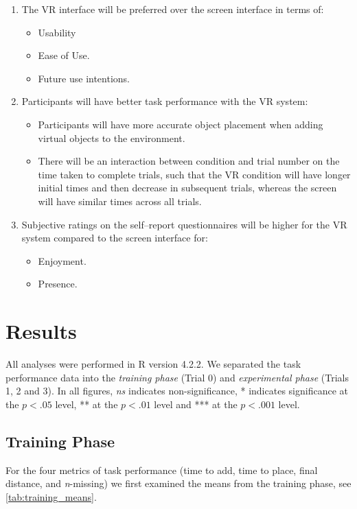 \documentclass[letterpaper, 10 pt, conference]{ieeeconf}  %
\begin{document}
\begin{enumerate}
    \item The VR interface will be preferred over the screen interface in terms of: 
    \begin{itemize}
        \item[a.] Usability
        \item[b.] Ease of Use.
        \item[c.] Future use intentions.
     \end{itemize}
    \item Participants will have better task performance with the VR system:
    \begin{itemize}
        \item[a.] Participants will have more accurate object placement when adding virtual objects to the environment.
        \item[b.] There will be an interaction between condition and trial number on the time taken to complete trials, such that the VR condition will have longer initial times and then decrease in subsequent trials, whereas the screen will have similar times across all trials.
    \end{itemize}
    \item Subjective ratings on the self–report questionnaires will be higher for the VR system compared to the screen interface for:
        \begin{itemize}
            \item[a.] Enjoyment.
            \item[b.] Presence.
        \end{itemize}
\end{enumerate}


\section{Results}
All analyses were performed in R version 4.2.2. We separated the task performance data into the \textit{training phase} (Trial 0) and \textit{experimental phase} (Trials 1, 2 and 3). In all figures, \textit{ns} indicates non-significance, * indicates significance at the $p < .05$ level, ** at the $p < .01$ level and *** at the $p < .001$ level.

\subsection{Training Phase}
For the four metrics of task performance (time to add, time to place, final distance, and \textit{n}-missing) we first examined the means from the training phase, see \cref{tab:training_means}. 
\end{document}
